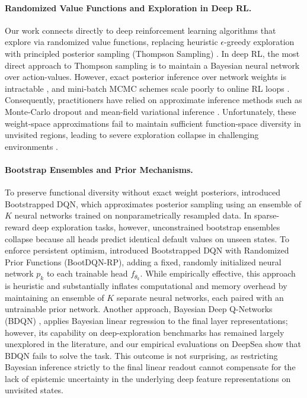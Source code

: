 \documentclass[10pt]{article}
\begin{document}
\paragraph{Randomized Value Functions and Exploration in Deep RL.}
Our work connects directly to deep reinforcement learning algorithms that explore via randomized value functions, replacing heuristic $\epsilon$-greedy exploration with principled posterior sampling (Thompson Sampling) \citep{thompson1933likelihood, osband2016deep, russo2018tutorial}. In deep RL, the most direct approach to Thompson sampling is to maintain a Bayesian neural network over action-values. However, exact posterior inference over network weights is intractable \citep{mackay2003information}, and mini-batch MCMC schemes scale poorly to online RL loops \citep{welling2011bayesian}. Consequently, practitioners have relied on approximate inference methods such as Monte-Carlo dropout \citep{gal2016dropout} and mean-field variational inference \citep{blundell2015weight}. Unfortunately, these weight-space approximations fail to maintain sufficient function-space diversity in unvisited regions, leading to severe exploration collapse in challenging environments \citep{osband2018randomized}.

\paragraph{Bootstrap Ensembles and Prior Mechanisms.}
To preserve functional diversity without exact weight posteriors, \citet{osband2016deep} introduced Bootstrapped DQN, which approximates posterior sampling using an ensemble of $K$ neural networks trained on nonparametrically resampled data. In sparse-reward deep exploration tasks, however, unconstrained bootstrap ensembles collapse because all heads predict identical default values on unseen states. To enforce persistent optimism, \citet{osband2018randomized} introduced Bootstrapped DQN with Randomized Prior Functions (BootDQN-RP), adding a fixed, randomly initialized neural network $p_k$ to each trainable head $f_{\theta_k}$. While empirically effective, this approach is heuristic and substantially inflates computational and memory overhead by maintaining an ensemble of $K$ separate neural networks, each paired with an untrainable prior network. Another approach, Bayesian Deep Q-Networks (BDQN) \citep{azizzadenesheli2018efficient}, applies Bayesian linear regression to the final layer representations; however, its capability on deep-exploration benchmarks has remained largely unexplored in the literature, and our empirical evaluations on DeepSea show that BDQN fails to solve the task. This outcome is not surprising, as restricting Bayesian inference strictly to the final linear readout cannot compensate for the lack of epistemic uncertainty in the underlying deep feature representations on unvisited states.
\end{document}
